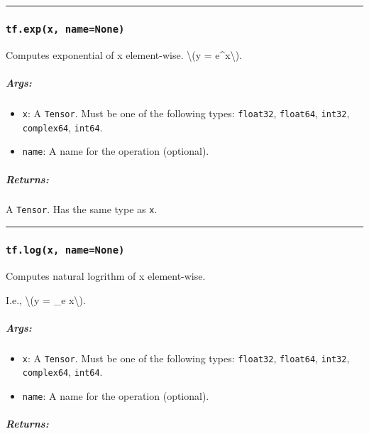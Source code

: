 \begin{center}\rule{0.5\linewidth}{\linethickness}\end{center}

\subsubsection{\texorpdfstring{\texttt{tf.exp(x,\ name=None)}
}{tf.exp(x, name=None) }}\label{tf.expx-namenone}

Computes exponential of x element-wise. \textbackslash{}(y =
e\^{}x\textbackslash{}).

\subparagraph{Args: }\label{args-15}

\begin{itemize}
\tightlist
\item
  \texttt{x}: A \texttt{Tensor}. Must be one of the following types:
  \texttt{float32}, \texttt{float64}, \texttt{int32},
  \texttt{complex64}, \texttt{int64}.
\item
  \texttt{name}: A name for the operation (optional).
\end{itemize}

\subparagraph{Returns: }\label{returns-15}

A \texttt{Tensor}. Has the same type as \texttt{x}.

\begin{center}\rule{0.5\linewidth}{\linethickness}\end{center}

\subsubsection{\texorpdfstring{\texttt{tf.log(x,\ name=None)}
}{tf.log(x, name=None) }}\label{tf.logx-namenone}

Computes natural logrithm of x element-wise.

I.e., \textbackslash{}(y = \log\_e x\textbackslash{}).

\subparagraph{Args: }\label{args-16}

\begin{itemize}
\tightlist
\item
  \texttt{x}: A \texttt{Tensor}. Must be one of the following types:
  \texttt{float32}, \texttt{float64}, \texttt{int32},
  \texttt{complex64}, \texttt{int64}.
\item
  \texttt{name}: A name for the operation (optional).
\end{itemize}

\subparagraph{Returns: }\label{returns-16}

